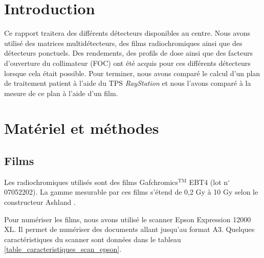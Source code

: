 \documentclass{book}
\begin{document}




\onehalfspacing

\pagestyle{fancy}
	\renewcommand\headrulewidth{0.5pt}
	\renewcommand\footrulewidth{0.5pt}
	\fancyfoot[R]{\thepage}

\tableofcontents
\clearpage
\chapter*{Introduction}

Ce rapport traitera des différents détecteurs disponibles au centre. Nous avons utilisé des matrices multidétecteurs, des films radiochromiques ainsi que des détecteurs ponctuels. Des rendements, des profils de dose ainsi que des facteurs d'ouverture du collimateur (FOC) ont été acquis pour ces différents détecteurs lorsque cela était possible. Pour terminer, nous avons comparé le calcul d'un plan de traitement patient à l'aide du TPS \textit{RayStation} et nous l'avons comparé à la mesure de ce plan à l'aide d'un film.

\chapter{Matériel et méthodes}
\section{Films}

Les radiochromiques utilisés sont des films Gafchromics$^{\text{TM}}$ EBT4 (lot n$^{\circ}$07052202). La gamme mesurable par ces films s'étend de 0,2 Gy à 10 Gy selon le constructeur Ashland \cite{EBT4}.

Pour numériser les films, nous avons utilisé le scanner Epson Expression 12000 XL. Il permet de numériser des documents allant jusqu'au format A3. Quelques caractéristiques du scanner sont données dans le tableau \ref*{table_caracteristiques_scan_epson}.
\end{document}

